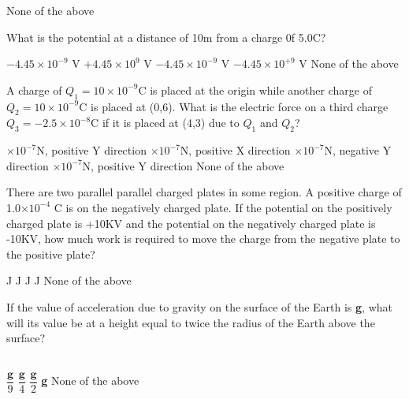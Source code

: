 \documentclass[13pt,addpoints]{exam}
\begin{document}
{{{\begin{questions}
\begin{oneparchoices}
						\choice None of the above
					\end{oneparchoices}
					\question What is the potential at a distance of 10m from a charge 0f 5.0C?\\
					\begin{oneparchoices}
						\choice $-4.45\times10^{-9}$ V
						\choice $+4.45\times10^{9}$ V
						\choice $-4.45\times10^{-9}$ V
						\choice $-4.45\times10^{+9}$ V
						\choice None of the above
					\end{oneparchoices}
					\question A charge of $Q_1=10\times10^{-9}$C is placed at the origin while another charge of $Q_2=10\times10^{-9}$C is placed at (0,6). What is the electric force on a third charge $Q_3=-2.5\times10^{-8}$C if it is placed at (4,3) due to $Q_1$ and $Q_2$?\\
					\begin{oneparchoices}
						$\times10^{-7}$N, positive Y direction 
						$\times10^{-7}$N, positive X direction
						$\times10^{-7}$N, negative Y direction
						$\times10^{-7}$N, positive Y direction
						\choice None of the above
					\end{oneparchoices}
					\question There are two parallel parallel charged plates in some region. A positive charge of 1.0$\times10^{-4}$ C is on the negatively charged plate. If the potential on the positively charged plate is +10KV and the potential on the negatively charged plate is -10KV, how much work is required to move the charge from the negative plate to the positive plate?\\
					\begin{oneparchoices}
						\choice 2.0 J
						\choice 0.0 J
						\choice 4.0 J
						\choice 1.0 J
						\choice None of the above
					\end{oneparchoices} 
					\question If the value of acceleration due to gravity on the surface of the Earth is \textbf{g}, what will its value be at a height equal to twice the radius of the Earth above the surface?\\ \\
					\begin{oneparchoices}
						\choice $\dfrac{\textbf{g}}{9}$
						\choice $\dfrac{\textbf{g}}{4}$
						\choice $\dfrac{\textbf{g}}{2}$
						\choice \textbf{g}
						\choice None of the above
					\end{oneparchoices}

\end{questions}}}}
\end{document}
